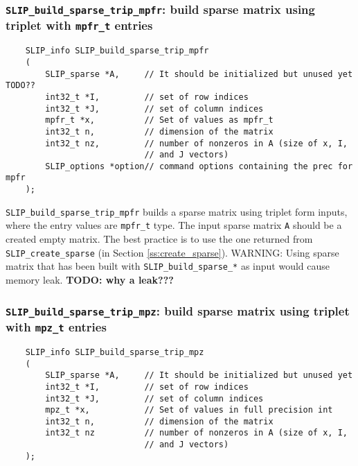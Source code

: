 \documentclass[12pt]{article}
\theoremstyle{definition}
\begin{document}
\cprotect\subsubsection{\verb|SLIP_build_sparse_trip_mpfr|: build sparse matrix using triplet with \verb|mpfr_t| entries}
\label{s:user:build_sparse_trip_mpfr}

\begin{mdframed}[userdefinedwidth=6in]
{\footnotesize
\begin{verbatim}
    SLIP_info SLIP_build_sparse_trip_mpfr
    (
        SLIP_sparse *A,     // It should be initialized but unused yet TODO??
        int32_t *I,         // set of row indices
        int32_t *J,         // set of column indices
        mpfr_t *x,          // Set of values as mpfr_t
        int32_t n,          // dimension of the matrix
        int32_t nz,         // number of nonzeros in A (size of x, I,
                            // and J vectors)
        SLIP_options *option// command options containing the prec for mpfr
    );
\end{verbatim}
} \end{mdframed}

\verb|SLIP_build_sparse_trip_mpfr| builds a sparse matrix using triplet form
inputs, where the entry values are \verb|mpfr_t| type. The input sparse matrix
\verb|A| should be a created empty matrix. The best practice is to use
the one returned from \verb|SLIP_create_sparse| (in Section
\ref{ss:create_sparse}). WARNING: Using sparse matrix that has been built with
\verb|SLIP_build_sparse_*| as input would cause memory leak.
{\bf TODO: why a leak???} %

\cprotect\subsubsection{\verb|SLIP_build_sparse_trip_mpz|: build sparse matrix using triplet with \verb|mpz_t| entries}
\label{s:user:build_sparse_trip_mpz}

\begin{mdframed}[userdefinedwidth=6in]
{\footnotesize
\begin{verbatim}
    SLIP_info SLIP_build_sparse_trip_mpz
    (
        SLIP_sparse *A,     // It should be initialized but unused yet
        int32_t *I,         // set of row indices
        int32_t *J,         // set of column indices
        mpz_t *x,           // Set of values in full precision int
        int32_t n,          // dimension of the matrix
        int32_t nz          // number of nonzeros in A (size of x, I,
                            // and J vectors)
    );
\end{verbatim}
} \end{mdframed}
\end{document}
